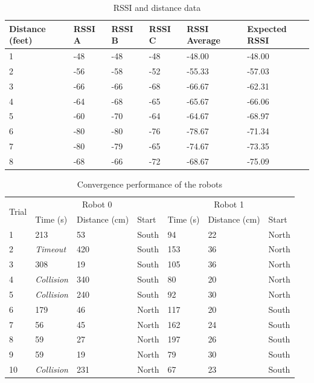 \documentclass[]{article}
\newcommand{\ra}[1]{\renewcommand{\arraystretch}{#1}}
\begin{document}
\begin{table}
  \centering
  \begin{tabular}[]{@{}llllll@{}}
  \toprule
  Distance (feet) & RSSI A & RSSI B & RSSI C & RSSI Average & Expected
  RSSI \\
  \midrule
  1 & -48 & -48 & -48 & -48.00 & -48.00 \\
  2 & -56 & -58 & -52 & -55.33 & -57.03 \\
  3 & -66 & -66 & -68 & -66.67 & -62.31 \\
  4 & -64 & -68 & -65 & -65.67 & -66.06 \\
  5 & -60 & -70 & -64 & -64.67 & -68.97 \\
  6 & -80 & -80 & -76 & -78.67 & -71.34 \\
  7 & -80 & -79 & -65 & -74.67 & -73.35 \\
  8 & -68 & -66 & -72 & -68.67 & -75.09 \\
  \bottomrule
  \end{tabular}
  \caption{RSSI and distance data}
  \label{table:rssidata}
\end{table}

\begin{table}[]
\centering
\ra{1.3}
\caption{Convergence performance of the robots}
\label{table:convergence}
\begin{tabular}{@{}lllllll@{}}
\toprule
\multirow{2}{*}{Trial} & \multicolumn{3}{c}{Robot 0}       & \multicolumn{3}{c}{Robot 1}      \\ \cmidrule(l){2-4} \cmidrule(l){5-7}
                       & Time (s)  & Distance (cm) & Start & Time (s) & Distance (cm) & Start \\ \midrule
1                      & 213       & 53            & South & 94       & 22            & North \\
2                      & \emph{Timeout} & 420           & South & 153      & 36            & North \\
3                      & 308       & 19            & South & 105      & 36            & North \\
4                      & \emph{Collision} & 340           & South & 80       & 20            & North \\
5                      & \emph{Collision} & 240           & South & 92       & 30            & North \\
6                      & 179       & 46            & North & 117      & 20            & South \\
7                      & 56        & 45            & North & 162      & 24            & South \\
8                      & 59        & 27            & North & 197      & 26            & South \\
9                      & 59        & 19            & North & 79       & 30            & South \\
10                     & \emph{Collision} & 231           & North & 67       & 23            & South \\ \bottomrule
\end{tabular}
\end{table}
\end{document}
